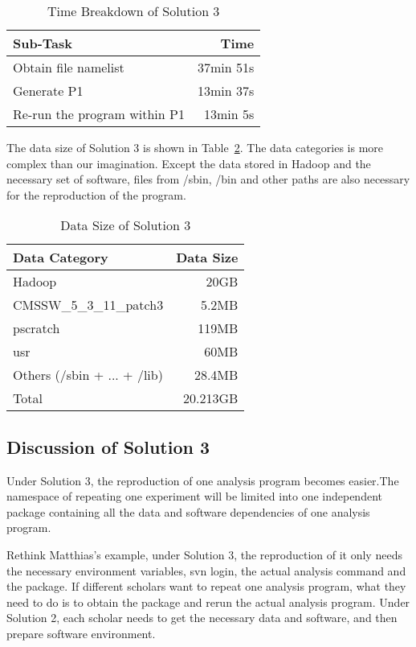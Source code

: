 \documentclass{acm_proc_article-sp}
\begin{document}
\begin{table}
    \centering
    \begin{tabular}{|l|r|}
    \hline
    Sub-Task & Time \\ \hline
    Obtain file namelist & 37min 51s \\ \hline
    Generate P1 & 13min 37s \\ \hline
    Re-run the program within P1 & 13min 5s \\ \hline
    \end{tabular}
    \caption{Time Breakdown of Solution 3}
    \label{table:time-3rd}
\end{table}

The data size of Solution 3 is shown in Table~\ref{table:datasize-3rd}. The data categories is more complex than our imagination. Except the data stored in Hadoop and the necessary set of software, files from /sbin, /bin and other paths are also necessary for the reproduction of the program.

\begin{table}
    \centering
    \begin{tabular}{|l|r|}
    \hline
    Data Category & Data Size \\ \hline
    Hadoop & 20GB \\ \hline
    CMSSW\_5\_3\_11\_patch3 & 5.2MB \\ \hline
    pscratch & 119MB \\ \hline
    usr & 60MB \\ \hline
    Others (/sbin + ... + /lib) & 28.4MB \\ \hline
    Total & 20.213GB \\ \hline
    \end{tabular}
    \caption{Data Size of Solution 3}
    \label{table:datasize-3rd}
\end{table}    

\subsection{Discussion of Solution 3}
Under Solution 3, the reproduction of one analysis program becomes easier.The namespace of repeating one experiment will be limited into one independent package containing all the data and software dependencies of one analysis program. 

Rethink Matthias's example, under Solution 3, the reproduction of it only needs the necessary environment variables, svn login,  the actual analysis command and the package. If different scholars want to repeat one analysis program, what they need to do is to obtain the package and rerun the actual analysis program. Under Solution 2, each scholar needs to get the necessary data and software, and then prepare software environment. 
\end{document}
